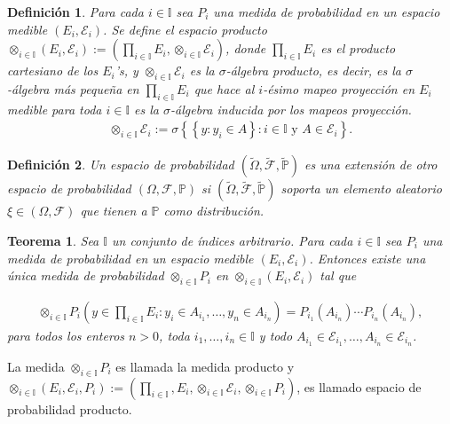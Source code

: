 \documentclass{article}
\newtheorem{Def}{Definición}[section]
\newtheorem{Teo}{Teorema}%
\newcommand{\prob}{\mathbb{P}}
\numberwithin{equation}{section}
\begin{document}
\begin{Def}
Para cada $i\in \mathbb{I}$ sea $P_{i}$ una medida de probabilidad en un espacio medible $\left(E_{i},\mathcal{E}_{i}\right)$. Se define el espacio producto $\otimes_{i\in\mathbb{I}}\left(E_{i},\mathcal{E}_{i}\right):=\left(\prod_{i\in\mathbb{I}}E_{i},\otimes_{i\in\mathbb{I}}\mathcal{E}_{i}\right)$, donde $\prod_{i\in\mathbb{I}}E_{i}$ es el producto cartesiano de los $E_{i}$'s, y $\otimes_{i\in\mathbb{I}}\mathcal{E}_{i}$ es la $\sigma$-\'algebra producto, es decir, es la $\sigma$-\'algebra m\'as peque\~na en $\prod_{i\in\mathbb{I}}E_{i}$ que hace al $i$-\'esimo mapeo proyecci\'on en $E_{i}$ medible para toda $i\in\mathbb{I}$ es la $\sigma$-\'algebra inducida por los mapeos proyecci\'on. 
\begin{eqnarray}
\otimes_{i\in\mathbb{I}}\mathcal{E}_{i}:=\sigma\left\{\left\{y:y_{i}\in A\right\}:i\in\mathbb{I}\textrm{ y }A\in\mathcal{E}_{i}\right\}.
\end{eqnarray}
\end{Def}

\begin{Def}
Un espacio de probabilidad $\left(\tilde{\Omega},\tilde{\mathcal{F}},\tilde{\prob}\right)$ es una extensi\'on de otro espacio de probabilidad $\left(\Omega,\mathcal{F},\prob\right)$ si $\left(\tilde{\Omega},\tilde{\mathcal{F}},\tilde{\prob}\right)$ soporta un elemento aleatorio $\xi\in\left(\Omega,\mathcal{F}\right)$ que tienen a $\prob$ como distribuci\'on.
\end{Def}

\begin{Teo}
Sea $\mathbb{I}$ un conjunto de \'indices arbitrario. Para cada $i\in\mathbb{I}$ sea $P_{i}$ una medida de probabilidad en un espacio medible $\left(E_{i},\mathcal{E}_{i}\right)$. Entonces existe una \'unica medida de probabilidad $\otimes_{i\in\mathbb{I}}P_{i}$ en $\otimes_{i\in\mathbb{I}}\left(E_{i},\mathcal{E}_{i}\right)$ tal que 

\begin{eqnarray}
\otimes_{i\in\mathbb{I}}P_{i}\left(y\in\prod_{i\in\mathbb{I}}E_{i}:y_{i}\in A_{i_{1}},\ldots,y_{n}\in A_{i_{n}}\right)=P_{i_{1}}\left(A_{i_{n}}\right)\cdots P_{i_{n}}\left(A_{i_{n}}\right),
\end{eqnarray}
para todos los enteros $n>0$, toda $i_{1},\ldots,i_{n}\in\mathbb{I}$ y todo $A_{i_{1}}\in\mathcal{E}_{i_{1}},\ldots,A_{i_{n}}\in\mathcal{E}_{i_{n}}$.
\end{Teo}

La medida $\otimes_{i\in\mathbb{I}}P_{i}$ es llamada la medida producto y $\otimes_{i\in\mathbb{I}}\left(E_{i},\mathcal{E}_{i},P_{i}\right):=\left(\prod_{i\in\mathbb{I}},E_{i},\otimes_{i\in\mathbb{I}}\mathcal{E}_{i},\otimes_{i\in\mathbb{I}}P_{i}\right)$, es llamado espacio de probabilidad producto.
\end{document}
